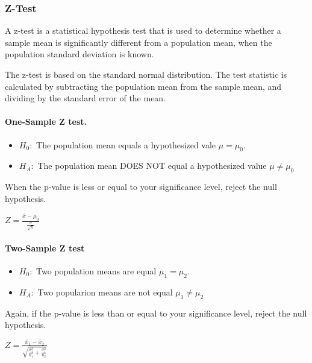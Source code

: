\documentclass[11pt]{article}
\providecommand{\tightlist}{%
      \setlength{\itemsep}{0pt}\setlength{\parskip}{0pt}}
\begin{document}
\hypertarget{z-test}{%
\subsubsection{Z-Test}\label{z-test}}

A z-test is a statistical hypothesis test that is used to determine
whether a sample mean is significantly different from a population mean,
when the population standard deviation is known.

The z-test is based on the standard normal distribution. The test
statistic is calculated by subtracting the population mean from the
sample mean, and dividing by the standard error of the mean.

\hypertarget{one-sample-z-test.}{%
\paragraph{One-Sample Z test.}\label{one-sample-z-test.}}

\begin{itemize}
\tightlist
\item
  \(H_0:\) The population mean equals a hypothesized vale
  \(\mu = \mu_0\).
\item
  \(H_A:\) The population mean DOES NOT equal a hypothesized value
  \(\mu \neq  \mu_0\)
\end{itemize}

When the p-value is less or equal to your significance level, reject the
null hypothesis.

\(Z = \frac{\bar{x} - \mu_0}{\frac{\sigma}{\sqrt{n}}}\)

\hypertarget{two-sample-z-test}{%
\paragraph{Two-Sample Z test}\label{two-sample-z-test}}

\begin{itemize}
\tightlist
\item
  \(H_0:\) Two population means are equal \(\mu_1 = \mu_2\).
\item
  \(H_A:\) Two popularion means are not equal \(\mu_1 \neq \mu_2\)
\end{itemize}

Again, if the p-value is less than or equal to your significance level,
reject the null hypothesis.

\(Z = \frac{\bar{x}_1 - \bar{x}_2}{\sqrt{\frac{\sigma^2_1}{n_1} + \frac{\sigma^2_1}{n_2}}}\)
\end{document}
